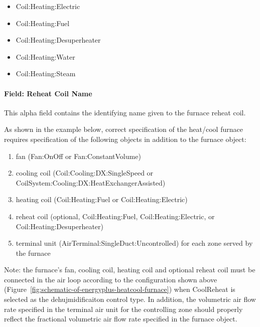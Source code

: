 \begin{itemize}
\item
  Coil:Heating:Electric
\item
  Coil:Heating:Fuel
\item
  Coil:Heating:Desuperheater
\item
  Coil:Heating:Water
\item
  Coil:Heating:Steam
\end{itemize}

\paragraph{Field: Reheat Coil Name}\label{field-reheat-coil-name-000}

This alpha field contains the identifying name given to the furnace reheat coil.

As shown in the example below, correct specification of the heat/cool furnace requires specification of the following objects in addition to the furnace object:

\begin{enumerate}
\def\labelenumi{\arabic{enumi})}
\item
  fan (Fan:OnOff or Fan:ConstantVolume)
\item
  cooling coil (Coil:Cooling:DX:SingleSpeed or CoilSystem:Cooling:DX:HeatExchangerAssisted)
\item
  heating coil (Coil:Heating:Fuel or Coil:Heating:Electric)
\item
  reheat coil (optional, Coil:Heating:Fuel, Coil:Heating:Electric, or Coil:Heating:Desuperheater)
\item
  terminal unit (AirTerminal:SingleDuct:Uncontrolled) for each zone served by the furnace
\end{enumerate}

Note: the furnace's fan, cooling coil, heating coil and optional reheat coil must be connected in the air loop according to the configuration shown above (Figure~\ref{fig:schematic-of-energyplus-heatcool-furnace}) when CoolReheat is selected as the dehujmidificaiton control type. In addition, the volumetric air flow rate specified in the terminal air unit for the controlling zone should properly reflect the fractional volumetric air flow rate specified in the furnace object.

